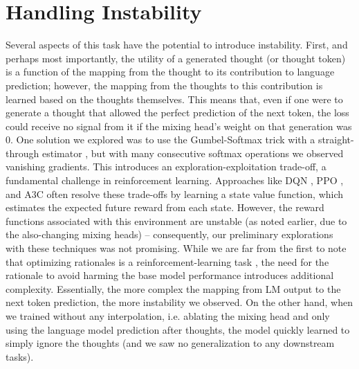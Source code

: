 \documentclass{article} %
\begin{document}
\section{Handling Instability}
\label{instability}
Several aspects of this task have the potential to introduce instability. 
First, and perhaps most importantly, the utility of a generated thought (or thought token) is a function of the mapping from the thought to its contribution to language prediction; however, the mapping from the thoughts to this contribution is learned based on the thoughts themselves. This means that, even if one were to generate a thought that allowed the perfect prediction of the next token, the loss could receive no signal from it if the mixing head's weight on that generation was 0. One solution we explored was to use the Gumbel-Softmax trick with a straight-through estimator \cite{jang2016categorical}, but with many consecutive softmax operations we observed vanishing gradients.
This introduces an exploration-exploitation trade-off, a fundamental challenge in reinforcement learning. Approaches like DQN \citep{mnih2013playing}, PPO \citep{schulman2017proximal}, and A3C \citep{mnih2016asynchronous} often resolve these trade-offs by learning a state value function, which estimates the expected future reward from each state.
However, the reward functions associated with this environment are unstable (as noted earlier, due to the also-changing mixing heads) -- consequently, our preliminary explorations with these techniques was not promising. 
While we are far from the first to note that optimizing rationales is a reinforcement-learning task \citep{zelikman2022star,zhang2023chain,phan2023training}, the need for the rationale to avoid harming the base model performance introduces additional complexity. Essentially, the more complex the mapping from LM output to the next token prediction, the more instability we observed. On the other hand, when we trained without any interpolation, i.e. ablating the mixing head and only using the language model prediction after thoughts, the model quickly learned to simply ignore the thoughts (and we saw no generalization to any downstream tasks).
\end{document}
